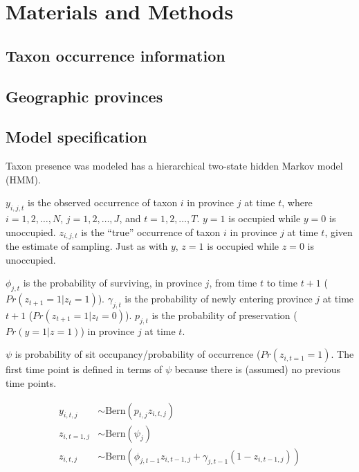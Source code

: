 \documentclass[12pt,letterpaper]{article}
\begin{document}
\section{Materials and Methods}

\subsection{Taxon occurrence information}

\subsection{Geographic provinces}

\subsection{Model specification}
Taxon presence was modeled has a hierarchical two-state hidden Markov model (HMM).


\(y_{i, j, t}\) is the observed occurrence of taxon \(i\) in province \(j\) at time \(t\), where \(i = 1, 2, \dots, N\), \(j = 1, 2, \dots, J\), and \(t = 1, 2, \dots, T\). \(y = 1\) is occupied while \(y = 0\) is unoccupied. \(z_{i, j, t}\) is the ``true'' occurrence of taxon \(i\) in province \(j\) at time \(t\), given the estimate of sampling. Just as with \(y\), \(z = 1\) is occupied while \(z = 0\) is unoccupied. 

\(\phi_{j, t}\) is the probability of surviving, in province \(j\), from time \(t\) to time \(t + 1\) (\(Pr(z_{t + 1} = 1 | z_{t} = 1)\)). \(\gamma_{j, t}\) is the probability of newly entering province \(j\) at time \(t + 1\) (\(Pr(z_{t + 1} = 1 | z_{t} = 0)\)). \(p_{j, t}\) is the probability of preservation (\(Pr(y = 1 | z = 1)\)) in province \(j\) at time \(t\). 

\(\psi\) is probability of sit occupancy/probability of occurrence (\(Pr(z_{i, t = 1} = 1)\). The first time point is defined in terms of \(\psi\) because there is (assumed) no previous time points.

\begin{equation}
  \begin{aligned}
    y_{i, t, j} &\sim \mathrm{Bern}(p_{t, j} z_{i, t, j}) \\
    z_{i, t = 1, j} &\sim \mathrm{Bern}(\psi_{j}) \\
    z_{i, t, j} &\sim \mathrm{Bern}(\phi_{j, t - 1} z_{i, t - 1, j} + \gamma_{j, t - 1} (1 - z_{i, t - 1, j}))
  \end{aligned}
\end{equation}
\end{document}
